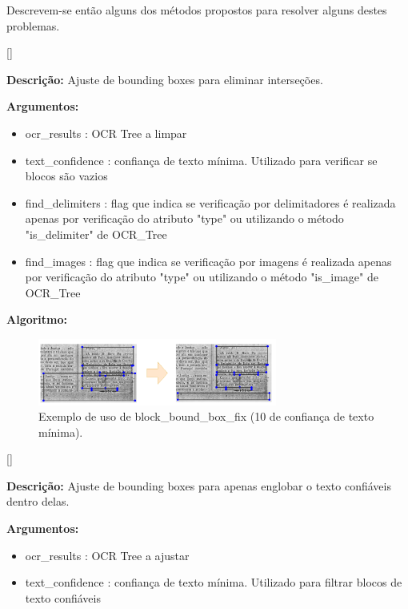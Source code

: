 Descrevem-se então alguns dos métodos propostos para resolver alguns destes problemas.


[\normalsize]

\textbf{Descrição:} Ajuste de bounding boxes para eliminar interseções.

\textbf{Argumentos:}
\begin{itemize}\setlength\itemsep{-0.3em}
	\item ocr\_results : OCR Tree a limpar
	\item text\_confidence : confiança de texto mínima. Utilizado para verificar se blocos são vazios
	\item find\_delimiters : flag que indica se verificação por delimitadores é realizada apenas por verificação do atributo "type" ou utilizando o método "is\_delimiter" de OCR\_Tree
	\item find\_images : flag que indica se verificação por imagens é realizada apenas por verificação do atributo "type" ou utilizando o método "is\_image" de OCR\_Tree
\end{itemize}

\textbf{Algoritmo:}



\begin{figure}[H]
	\centering
	\includegraphics[width=0.7\textwidth]{images/ilustracoes/fix_bound_box_blocks.png}
	\caption{Exemplo de uso de block\_bound\_box\_fix (10 de confiança de texto mínima).}
	\label{fig:fix_bound_box_blocks}
\end{figure}



[\normalsize]

\textbf{Descrição:} Ajuste de bounding boxes para apenas englobar o texto confiáveis dentro delas.

\textbf{Argumentos:}
\begin{itemize}\setlength\itemsep{-0.3em}
	\item ocr\_results : OCR Tree a ajustar
	\item text\_confidence : confiança de texto mínima. Utilizado para filtrar blocos de texto confiáveis
\end{itemize}

